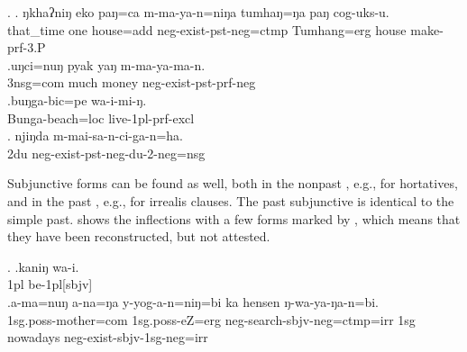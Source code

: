 \ex. \ag.     ŋkhaʔniŋ eko paŋ=ca         m-ma-ya-n=niŋa       tumhaŋ=ŋa   paŋ  cog-uks-u.\\
that\_time one house{\sc =add} {\sc neg-}exist{\sc [3sg]-pst-neg=ctmp} Tumhang{\sc =erg} house make{\sc -prf-3.P}\\
 
\bg.uŋci=nuŋ   pyak yaŋ  m-ma-ya-ma-n.\\
{\sc 3nsg=com} much money {\sc neg-}exist{\sc [3sg]-pst-prf-neg}\\
 
\bg.buŋga-bic=pe      wa-i-mi-ŋ.\\
Bunga-beach{\sc =loc} live{\sc -1pl-prf-excl}\\
 
\bg. njiŋda m-mai-sa-n-ci-ga-n=ha.\\
{\sc 2du} {\sc neg-}exist{\sc -pst-neg-du-2-neg=nsg}\\
         


Subjunctive forms can be found as well, both in the nonpast \Next[a], e.g., for hortatives, and in the past \Next[b], e.g., for irrealis clauses. The past subjunctive is identical to the simple past.   shows the  inflections with a few forms marked by , which means that they  have been reconstructed, but not attested.

\ex. \ag.kaniŋ wa-i.\\
{\sc 1pl} be{\sc -1pl[sbjv]}\\
\bg.a-ma=nuŋ a-na=ŋa y-yog-a-n=niŋ=bi ka hensen ŋ-wa-ya-ŋa-n=bi.\\
{\sc 1sg.poss-}mother{\sc =com} {\sc 1sg.poss-}eZ{\sc =erg} {\sc neg-}search{\sc -sbjv-neg=ctmp=irr} {\sc 1sg} nowadays {\sc neg-}exist{\sc -sbjv-1sg-neg=irr} \\
 

%


